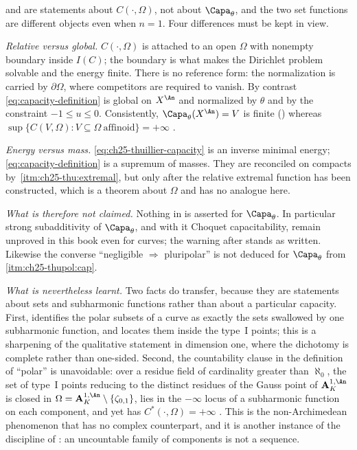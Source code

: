 \begin{remark}
\label{rem:ch25-thuillier-vs-bfj}
 and  are
statements about $C(\cdot,\Omega)$, not about $\Capa_\theta$, and the two
set functions are different objects even when $n=1$.  Four
differences must be kept in view.

\emph{Relative versus global.}  $C(\cdot,\Omega)$ is attached to an open
$\Omega$ with nonempty boundary inside $I(C)$; the boundary is what
makes the Dirichlet problem solvable and the energy finite.  There is no
reference form: the normalization is carried by $\partial\Omega$, where
competitors are required to vanish.  By contrast
\eqref{eq:capacity-definition} is global on $X^{\An}$ and normalized by
$\theta$ and by the constraint $-1\leq u\leq0$.  Consistently,
$\Capa_\theta(X^{\An})=V$ is finite
() whereas
$\sup\{C(V,\Omega):V\subseteq\Omega\ \text{affinoid}\}=+\infty$
\cite[Lemme~3.6.28]{Thu05}.

\emph{Energy versus mass.}  \eqref{eq:ch25-thuillier-capacity} is an
inverse minimal energy; \eqref{eq:capacity-definition} is a supremum of
masses.  They are reconciled on compacts by
\,\cref{itm:ch25-thu:extremal}, but only
after the relative extremal function has been constructed, which is a
theorem about $\Omega$ and has no analogue here.

\emph{What is therefore not claimed.}  Nothing in
 is asserted for $\Capa_\theta$.  In
particular strong subadditivity of $\Capa_\theta$, and with it Choquet
capacitability, remain unproved in this book even for curves; the warning
after  stands as written.  Likewise the
converse ``negligible $\Rightarrow$ pluripolar'' is not deduced for
$\Capa_\theta$ from
\,\cref{itm:ch25-thupol:cap}.

\emph{What is nevertheless learnt.}  Two facts do transfer, because they are
statements about sets and subharmonic functions rather than about a
particular capacity.  First,
 identifies the polar subsets of a curve as
exactly the sets swallowed by one subharmonic function, and locates them
inside the type~$\mathrm{I}$ points; this is a sharpening of the
qualitative statement  in dimension
one, where the dichotomy is complete rather than one-sided.  Second, the
countability clause in the definition of ``polar'' is unavoidable: over a
residue field of cardinality greater than $\aleph_0$, the set of type~I
points reducing to the distinct residues of the Gauss point of
$\mathbf A^{1,\An}_K$ is closed in
$\Omega=\mathbf A^{1,\An}_K\setminus\{\zeta_{0,1}\}$, lies in the
$-\infty$ locus of a subharmonic function on each component, and yet has
$C^*(\cdot,\Omega)=+\infty$ \cite[Remarque~3.6.12]{Thu05}.  This is the
non-Archimedean phenomenon that has no complex counterpart, and it is
another instance of the discipline of : an uncountable
family of components is not a sequence.
\end{remark}

